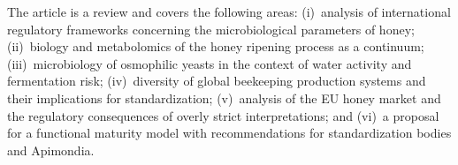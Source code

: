 The article is a review and covers the following areas:
(i)~analysis of international regulatory frameworks concerning
the microbiological parameters of honey;
(ii)~biology and metabolomics of the honey ripening process
as a continuum;
(iii)~microbiology of osmophilic yeasts in the context of water
activity and fermentation risk;
(iv)~diversity of global beekeeping production systems and their
implications for standardization;
(v)~analysis of the EU honey market and the regulatory consequences
of overly strict interpretations; and
(vi)~a proposal for a functional maturity model with recommendations
for standardization bodies and Apimondia.
